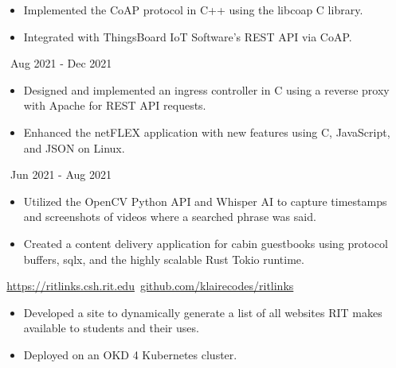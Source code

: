\documentclass[11pt,letterpaper,ragged2e]{altacv}
\begin{document}
{
	\begin{itemize}
		\item Implemented the CoAP protocol in C++ using the libcoap C library.
		\item Integrated with ThingsBoard IoT Software's REST API via CoAP.
	\end{itemize}
}
{\faCalendar\, Aug 2021 - Dec 2021}
{
}

{
	\begin{itemize}
		\item Designed and implemented an ingress controller in C using a reverse proxy with Apache for REST API requests.
		\item Enhanced the netFLEX application with new features using C, JavaScript, and JSON on Linux.
	\end{itemize}
}
{\faCalendar\, Jun 2021 - Aug 2021}
{
}



{
	\begin{itemize}
		\item Utilized the OpenCV Python API and Whisper AI to capture timestamps and screenshots of videos where a searched phrase was said.
	\end{itemize}
}
{
}

{
	\begin{itemize}
		\item Created a content delivery application for cabin guestbooks using protocol buffers, sqlx, and the highly scalable Rust Tokio runtime.
	\end{itemize}
}
{
}

{
	{\faLink} \,\href{https://ritlinks.csh.rit.edu}{https://ritlinks.csh.rit.edu}\quad
	{\faGithub} \,\href{https://github.com/klairecodes/ritlinks}{github.com/klairecodes/ritlinks}
}
{
	\begin{itemize}
		\item Developed a site to dynamically generate a list of all websites RIT makes available to students and their uses.
		\item Deployed on an OKD 4 Kubernetes cluster.
	\end{itemize}
}
{
}


\clearpage

\nocite{*}
\end{document}
